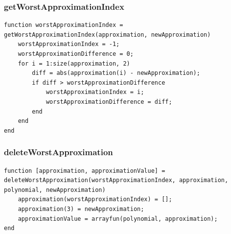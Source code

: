 \subsubsection{getWorstApproximationIndex}
\begin{simplechar}
\begin{lstlisting}
function worstApproximationIndex = getWorstApproximationIndex(approximation, newApproximation)
    worstApproximationIndex = -1;
    worstApproximationDifference = 0;
    for i = 1:size(approximation, 2)
        diff = abs(approximation(i) - newApproximation);
        if diff > worstApproximationDifference
            worstApproximationIndex = i;
            worstApproximationDifference = diff;
        end
    end
end
\end{lstlisting}
\end{simplechar}

\subsubsection{deleteWorstApproximation}
\begin{simplechar}
\begin{lstlisting}
function [approximation, approximationValue] = deleteWorstApproximation(worstApproximationIndex, approximation, polynomial, newApproximation)
    approximation(worstApproximationIndex) = [];
    approximation(3) = newApproximation;
    approximationValue = arrayfun(polynomial, approximation);
end
\end{lstlisting}
\end{simplechar}

\newpage
